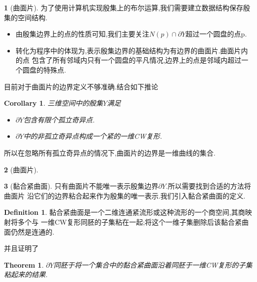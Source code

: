 \documentclass[UTF8]{ctexbeamer}	%
\theoremstyle{plain}
\newtheorem{rtm}{Theorem}[section]
\newtheorem{cor}{Corollary}[section]
\theoremstyle{definition}
\newtheorem{emt}{}[section]
\newtheorem{defn}{Definition}[section]
\theoremstyle{remark}
\numberwithin{equation}{section}
\begin{document}
\begin{frame}
    \begin{emt}[曲面片]
        为了使用计算机实现殷集上的布尔运算,我们需要建立数据结构保存殷集的空间结构.
        \begin{itemize}
            \item 由殷集边界上的点的性质可知,我们主要关注$N(p) \cap \partial Y$超过一个圆盘的点p.
            \item 转化为程序中的体现为,表示殷集边界的基础结构为有边界的曲面片.曲面片内的点
            包含了所有邻域内只有一个圆盘的平凡情况,边界上的点是邻域内超过一个圆盘的特殊点.
        \end{itemize}
        目前对于曲面片的边界定义不够准确.结合如下推论
        \begin{cor}
三维空间中的殷集$Y$满足
\begin{itemize}
    \item $\partial Y$包含有限个孤立奇异点.
    \item $\partial Y$中的非孤立奇异点构成一个紧的一维CW复形.
\end{itemize}
            \end{cor}
            所以在忽略所有孤立奇异点的情况下,曲面片的边界是一维曲线的集合.
    \end{emt}
\end{frame}

\begin{frame}
    \begin{emt}[曲面片]
    \end{emt}
\end{frame}

\begin{frame}
    \begin{emt}[黏合紧曲面]
        只有曲面片不能唯一表示殷集边界$\partial Y$.所以需要找到合适的方法将曲面片
        沿它们的边界粘合起来作为殷集的唯一表示.我们引入黏合紧曲面的定义.

        \begin{defn}
            黏合紧曲面是一个二维连通紧流形或这种流形的一个商空间,其商映射将多个与
            一维CW复形同胚的子集粘在一起;将这个一维子集删除后该黏合紧曲面仍然是连通的.
        \end{defn}

        并且证明了
\begin{rtm}
    $\partial Y$同胚于将一个集合中的黏合紧曲面沿着同胚于一维CW复形的子集粘起来的结果.
\end{rtm}

    \end{emt}
\end{frame}
\end{document}

